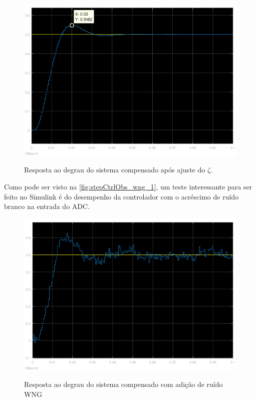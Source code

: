 \documentclass[
	article,			%
	11pt,				%
	oneside,			%
	a4paper,			%
	english,			%
	brazil,				%
	sumario=tradicional
	]{abntex2}
\begin{document}
\begin{figure}[htb!]
	\centering
	\caption{Resposta ao degrau do sistema compensado após ajuste do $\zeta$.}
	\includegraphics[scale=0.55]{./img/stepCtrlObs_ajustado_1.png}
	\label{fig:stepCtrlObs_ajustado_1}
\end{figure}

\pagebreak

Como pode ser visto na \autoref{fig:stepCtrlObs_wng_1}, um teste interessante para ser feito no Simulink é do desempenho da controlador com o acréscimo de ruído branco na entrada do ADC.

\begin{figure}[htb!]
	\centering
	\caption{Resposta ao degrau do sistema compensado com adição de ruído WNG}
	\includegraphics[scale=0.55]{./img/stepCtrlObs_wng_1.png}
	\label{fig:stepCtrlObs_wng_1}
\end{figure}
\end{document}
